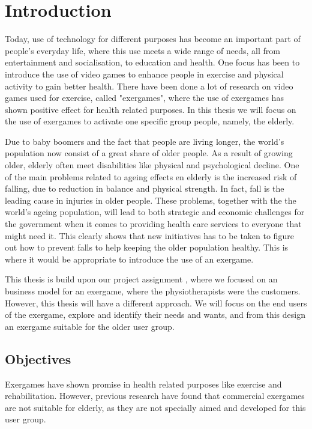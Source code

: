 \chapter{Introduction}

Today, use of technology for different purposes has become an important part of people's everyday life, where this use meets a wide range of needs, all from entertainment and socialisation, to education and health. One focus has been to introduce the use of video games to enhance people in exercise and physical activity to gain better health. There have been done a lot of research on video games used for exercise, called "exergames", where the use of exergames has shown positive effect for health related purposes. In this thesis we will focus on the use of exergames to activate one specific group people, namely, the elderly. 

Due to baby boomers and the fact that people are living longer, the world's population now consist of a great share of older people. As a result of growing older, elderly often meet disabilities like physical and psychological decline. One of the main problems related to ageing effects en elderly is the increased risk of falling, due to reduction in balance and physical strength. In fact, fall is the leading cause in injuries in older people. These problems, together with the the world's ageing population, will lead to both strategic and economic challenges for the government when it comes to providing health care services to everyone that might need it. This clearly shows that new initiatives has to be taken to figure out how to prevent falls to help keeping the older population healthy. This is where it would be appropriate to introduce the use of an exergame. 

This thesis is build upon our project assignment \cite{project}, where we focused on an business model for an exergame, where the physiotherapists were the customers. However, this thesis will have a different approach. We will focus on the end users of the exergame, explore and identify their needs and wants, and from this design an exergame suitable for the older user group.         

\section{Objectives}
\label{sec:researchq} Exergames have shown promise in health related purposes like exercise and rehabilitation. However, previous research have found that commercial exergames are not suitable for elderly, as they are not specially aimed and developed for this user group. 

